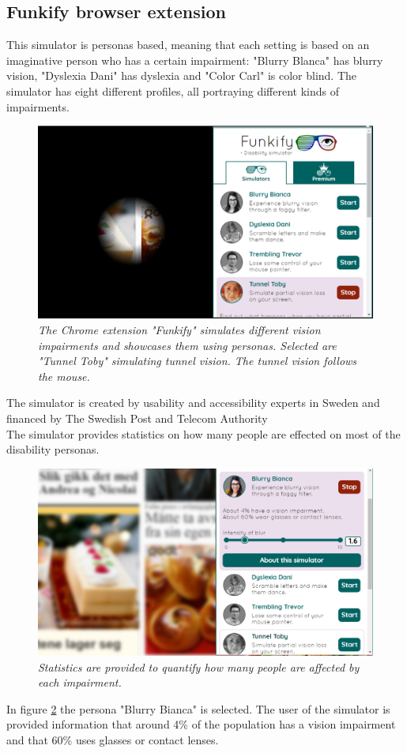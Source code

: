 \subsection{Funkify browser extension}
This simulator is personas based, meaning that each setting is based on an imaginative person who has a certain impairment: "Blurry Blanca" has blurry vision, "Dyslexia Dani" has dyslexia and "Color Carl" is color blind. The simulator has eight different profiles, all portraying different kinds of impairments.
\begin{figure}[H]
  \includegraphics[width=\linewidth]{img/funkify.png}
  \caption{\textit{The Chrome extension "Funkify" simulates different vision impairments and showcases them using personas. Selected are "Tunnel Toby" simulating tunnel vision. The tunnel vision follows the mouse.}}\label{fig:funkify_tunnel}
\endminipage\hfill
\end{figure}
The simulator is created by usability and accessibility experts in Sweden and financed by The Swedish Post and Telecom Authority \parencite{funkify.org_funkify_????}\\

\noindent
The simulator provides statistics on how many people are effected on most of the disability personas.
\begin{figure}[H]
  \includegraphics[width=\linewidth]{img/funkify_stats.png}
  \caption{\textit{Statistics are provided to quantify how many people are affected by each impairment.}}\label{fig:funkify_statistics}
\endminipage\hfill
\end{figure}

In figure \ref{fig:funkify_statistics} the persona "Blurry Bianca" is selected. The user of the simulator is provided information that around 4\% of the population has a vision impairment and that 60\% uses glasses or contact lenses. 